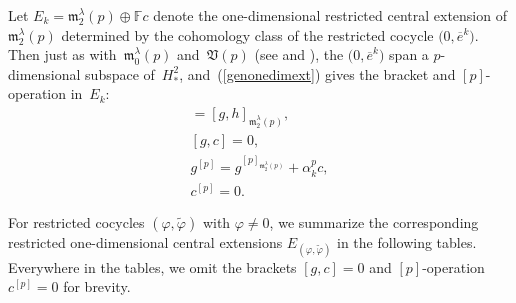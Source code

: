 \documentclass[10pt,a4paper]{amsart}
\def\phi{\varphi}
\def\m{\mathfrak m}
\def\V{\mathfrak V}
\def\F{\mathbb F}
\numberwithin{equation}{section}
\begin{document}
Let $E_k=\m_2^\lambda(p)\oplus \F c$ denote the one-dimensional restricted central extension of $\m_2^\lambda(p)$ determined by the cohomology class of the restricted cocycle $\big(0,\overline e^k\big)$. Then just as with~$\m_0^\lambda(p)$ and~$\V(p)$ (see \cite[Theorem~5.1]{EvFi2019} and \cite[Theorem~3.1]{EvFiPe2016}), the
$\big(0,\overline e^k\big)$ span a $p$-dimensional subspace of~$H^2_*$, and~(\ref{genonedimext}) gives the bracket and $[p]$-operation in~$E_k$:
\begin{gather*}
 [g,h] =[g,h]_{\m_2^\lambda(p)},\\
 [g, c] = 0,\\
 g^{[p]} = g^{[p]_{\m_2^\lambda(p)}}+ \alpha_k^p c,\\
 c^{[p]} = 0.
\end{gather*}

For restricted cocycles $(\phi,\tilde\phi)$ with $\phi\ne 0$, we summarize the corresponding restricted one-dimensional central extensions $E_{(\phi,\tilde\phi)}$ in the following tables. Everywhere in the tables, we omit the brackets $[g,c]=0$ and $[p]$-operation $c^{[p]}=0$ for brevity.
\end{document}
